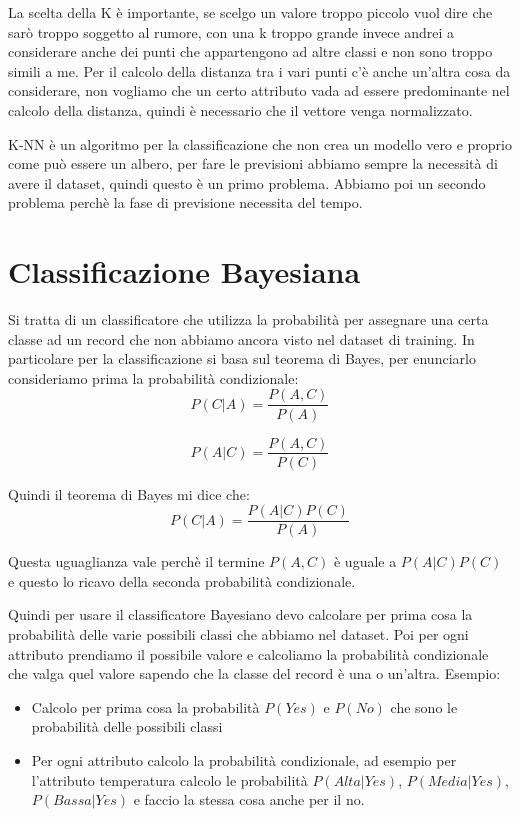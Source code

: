 \documentclass[14pt]{extreport}
\begin{document}
La scelta della K è importante, se scelgo un valore troppo piccolo vuol dire che sarò troppo soggetto al rumore, con una k troppo grande invece andrei a considerare anche dei punti che appartengono ad altre classi e non sono troppo simili a me.
Per il calcolo della distanza tra i vari punti c'è anche un'altra cosa da considerare, non vogliamo che un certo attributo vada ad essere predominante nel calcolo della distanza, quindi è necessario che il vettore venga normalizzato.

K-NN è un algoritmo per la classificazione che non crea un modello vero e proprio come può essere un albero, per fare le previsioni abbiamo sempre la necessità di avere il dataset, quindi questo è un primo problema. Abbiamo poi un secondo problema perchè la fase di previsione necessita del tempo.

\section{Classificazione Bayesiana}

Si tratta di un classificatore che utilizza la probabilità per assegnare una certa classe ad un record che non abbiamo ancora visto nel dataset di training.
In particolare per la classificazione si basa sul teorema di Bayes, per enunciarlo consideriamo prima la probabilità condizionale:
\begin{equation}
    P(C|A) = \frac{P(A,C)}{P(A)}    
\end{equation}

\begin{equation}
    P(A|C) = \frac{P(A,C)}{P(C)}
\end{equation}

Quindi il teorema di Bayes mi dice che:
\begin{equation}
    P(C|A) = \frac{P(A|C)P(C)}{P(A)}
\end{equation}

Questa uguaglianza vale perchè il termine $P(A,C)$ è uguale a $P(A|C)P(C)$ e questo lo ricavo della seconda probabilità condizionale.

Quindi per usare il classificatore Bayesiano devo calcolare per prima cosa la probabilità delle varie possibili classi che abbiamo nel dataset. Poi per ogni attributo prendiamo il possibile valore e calcoliamo la probabilità condizionale che valga quel valore sapendo che la classe del record è una o un'altra.
Esempio:
\begin{itemize}
    \item Calcolo per prima cosa la probabilità $P(Yes)$ e $P(No)$ che sono le probabilità delle possibili classi
    \item Per ogni attributo calcolo la probabilità condizionale, ad esempio per l'attributo temperatura calcolo le probabilità $P(Alta|Yes)$, $P(Media|Yes)$, $P(Bassa|Yes)$ e faccio la stessa cosa anche per il no.
\end{itemize}
\end{document}
